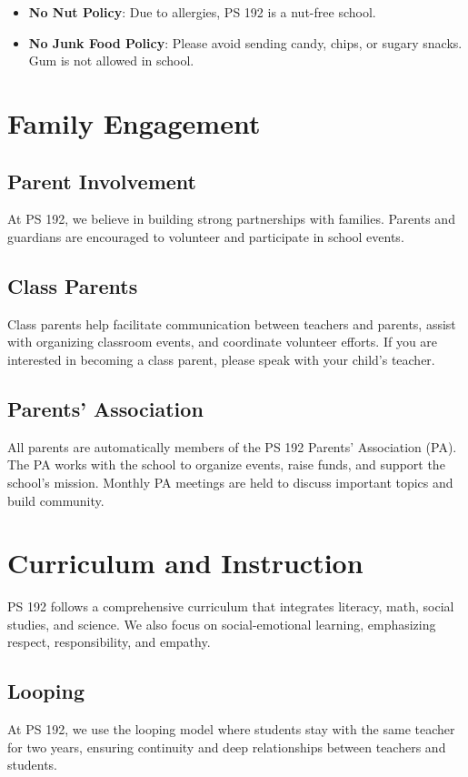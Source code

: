 \documentclass[11pt]{article}
\begin{document}
\begin{itemize}
\item \textbf{\textbf{No Nut Policy}}: Due to allergies, PS 192 is a nut-free school.
\item \textbf{\textbf{No Junk Food Policy}}: Please avoid sending candy, chips, or sugary snacks. Gum is not allowed in school.
\end{itemize}

\section{Family Engagement}
\label{sec:org209d550}
\subsection{Parent Involvement}
\label{sec:org50b3f38}
At PS 192, we believe in building strong partnerships with families. Parents and guardians are encouraged to volunteer and participate in school events.

\subsection{Class Parents}
\label{sec:org218387d}
Class parents help facilitate communication between teachers and parents, assist with organizing classroom events, and coordinate volunteer efforts. If you are interested in becoming a class parent, please speak with your child's teacher.

\subsection{Parents’ Association}
\label{sec:orgebcdeb5}
All parents are automatically members of the PS 192 Parents’ Association (PA). The PA works with the school to organize events, raise funds, and support the school's mission. Monthly PA meetings are held to discuss important topics and build community.

\section{Curriculum and Instruction}
\label{sec:org1d88339}
PS 192 follows a comprehensive curriculum that integrates literacy, math, social studies, and science. We also focus on social-emotional learning, emphasizing respect, responsibility, and empathy.

\subsection{Looping}
\label{sec:org863455f}
At PS 192, we use the looping model where students stay with the same teacher for two years, ensuring continuity and deep relationships between teachers and students.
\end{document}
